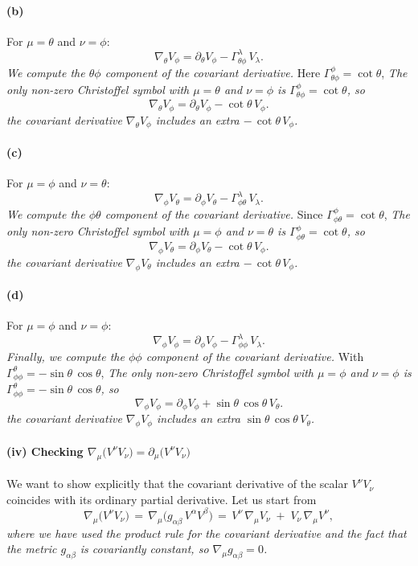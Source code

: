 \paragraph{(b)} For \(\mu = \theta\) and \(\nu = \phi\):
\[
\nabla_{\theta} V_\phi
=
\partial_\theta V_\phi
-
\Gamma^\lambda_{\theta\phi}\,V_\lambda.
\]
\emph{We compute the \(\theta\phi\) component of the covariant derivative.}
Here \(\Gamma^\phi_{\theta\phi} = \cot\theta\),
\emph{The only non-zero Christoffel symbol with \(\mu = \theta\) and \(\nu = \phi\) is \(\Gamma^\phi_{\theta\phi} = \cot\theta\), so}
\[
\nabla_{\theta} V_\phi
=
\partial_\theta V_\phi
-
\cot\theta \, V_\phi.
\]
\emph{the covariant derivative \(\nabla_{\theta} V_\phi\) includes an extra \(-\,\cot\theta \, V_\phi\).}

\paragraph{(c)} For \(\mu = \phi\) and \(\nu = \theta\):
\[
\nabla_{\phi} V_\theta
=
\partial_\phi V_\theta
-
\Gamma^\lambda_{\phi\theta}\,V_\lambda.
\]
\emph{We compute the \(\phi\theta\) component of the covariant derivative.}
Since \(\Gamma^\phi_{\phi\theta} = \cot\theta\),
\emph{The only non-zero Christoffel symbol with \(\mu = \phi\) and \(\nu = \theta\) is \(\Gamma^\phi_{\phi\theta} = \cot\theta\), so}
\[
\nabla_{\phi} V_\theta
=
\partial_\phi V_\theta
-
\cot\theta \, V_\phi.
\]
\emph{the covariant derivative \(\nabla_{\phi} V_\theta\) includes an extra \(-\,\cot\theta \, V_\phi\).}

\paragraph{(d)} For \(\mu = \phi\) and \(\nu = \phi\):
\[
\nabla_{\phi} V_\phi
=
\partial_\phi V_\phi
-
\Gamma^\lambda_{\phi\phi}\,V_\lambda.
\]
\emph{Finally, we compute the \(\phi\phi\) component of the covariant derivative.}
With \(\Gamma^\theta_{\phi\phi} = -\sin\theta\,\cos\theta\),
\emph{The only non-zero Christoffel symbol with \(\mu = \phi\) and \(\nu = \phi\) is \(\Gamma^\theta_{\phi\phi} = -\sin\theta\,\cos\theta\), so}
\[
\nabla_{\phi} V_\phi
=
\partial_\phi V_\phi
+
\sin\theta\,\cos\theta \, V_\theta.
\]
\emph{the covariant derivative \(\nabla_{\phi} V_\phi\) includes an extra \(\sin\theta\,\cos\theta \, V_\theta\).}

\paragraph*{(iv) Checking \(\nabla_{\mu}\bigl(V^{\nu} V_{\nu}\bigr)=\partial_{\mu}\bigl(V^{\nu} V_{\nu}\bigr)\)}
We want to show explicitly that the covariant derivative of the scalar \(V^\nu V_\nu\) coincides with its ordinary partial derivative. Let us start from
\[
\nabla_\mu \bigl(V^\nu V_\nu \bigr)
\,=\,
\nabla_\mu \bigl(g_{\alpha\beta}\,V^\alpha V^\beta \bigr)
\,=\,
V^\nu \,\nabla_\mu V_\nu
\;+\;
V_\nu \,\nabla_\mu V^\nu,
\]
\emph{where we have used the product rule for the covariant derivative and the fact that the metric \(g_{\alpha\beta}\) is covariantly constant, so \(\nabla_\mu g_{\alpha\beta} = 0\).}

